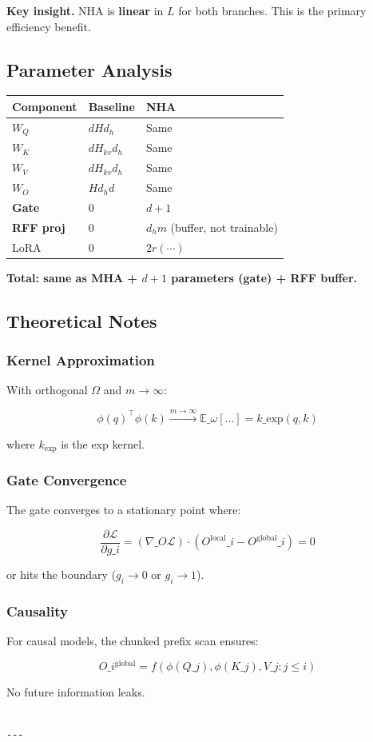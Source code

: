 \textbf{Key insight.} NHA is \textbf{linear} in $L$ for both branches. This is the 
primary efficiency benefit.

\subsection{Parameter Analysis}

\begin{table}[H]
\centering
\small
\begin{tabular}{lll}
\toprule
\textbf{Component} & \textbf{Baseline} & \textbf{NHA} \\
\midrule
$W_Q$ & $d H d_h$ & Same \\
$W_K$ & $d H_{kv} d_h$ & Same \\
$W_V$ & $d H_{kv} d_h$ & Same \\
$W_O$ & $H d_h d$ & Same \\
\textbf{Gate} & 0 & $d + 1$ \\
\textbf{RFF proj} & 0 & $d_h m$ (buffer, not trainable) \\
LoRA & 0 & $2 r (\cdots)$ \\
\bottomrule
\end{tabular}
\end{table}

\textbf{Total: same as MHA + $d + 1$ parameters (gate) + RFF buffer.}

\subsection{Theoretical Notes}

\subsubsection{Kernel Approximation}

With orthogonal $\Omega$ and $m \to \infty$:

\[
\phi(q)^\top \phi(k) \xrightarrow{m \to \infty} \mathbb{E}\_\omega[\ldots] = k\_\text{exp}(q, k)
\tag{4.13}
\]

where $k_\text{exp}$ is the exp kernel.

\subsubsection{Gate Convergence}

The gate converges to a stationary point where:

\[
\frac{\partial \mathcal{L}}{\partial g\_i} = (\nabla\_O \mathcal{L}) \cdot (O^\text{local}\_i - O^\text{global}\_i) = 0
\tag{4.14}
\]

or hits the boundary ($g_i \to 0$ or $g_i \to 1$).

\subsubsection{Causality}

For causal models, the chunked prefix scan ensures:

\[
O\_i^\text{global} = f(\phi(Q\_j), \phi(K\_j), V\_j : j \leq i)
\tag{4.15}
\]

No future information leaks.
\begin{lstlisting}

---
\end{lstlisting}